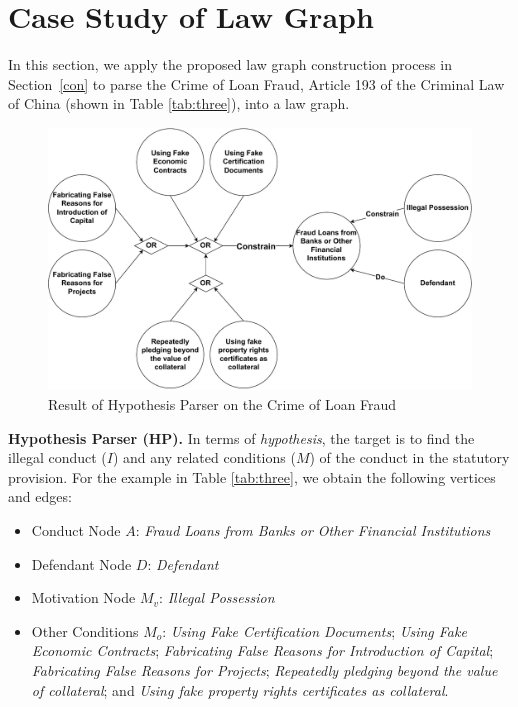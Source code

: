 \section{Case Study of Law Graph}
\label{sec:a}
In this section, we apply the proposed law graph construction process in Section~\ref{con} to parse the Crime of Loan Fraud, Article 193 of the Criminal Law of China (shown in Table \ref{tab:three}), into a law graph.

\begin{figure}[H]
    \centering
    \includegraphics[width=1\linewidth]{figs/HP-Result.pdf}
    \caption{Result of Hypothesis Parser on the Crime of Loan Fraud}
    \label{fig:HP-Result}
\end{figure}

\textbf{Hypothesis Parser (HP).} In terms of \textit{hypothesis}, the target is to find the illegal conduct (\( I \)) and any related conditions (\( M \)) of the conduct in the statutory provision. For the example in Table \ref{tab:three}, we obtain the following vertices and edges:
\begin{itemize}
    \item Conduct Node $A$: \textit{Fraud Loans from Banks or Other Financial Institutions}
    \item Defendant Node $D$: \textit{Defendant}
    \item Motivation Node $M_v$: \textit{Illegal Possession}
    \item Other Conditions $M_o$: \textit{Using Fake Certification Documents}; \textit{Using Fake Economic Contracts}; \textit{Fabricating False Reasons for Introduction of Capital}; \textit{Fabricating False Reasons for Projects}; \textit{Repeatedly pledging beyond the value of collateral}; and \textit{Using fake property rights certificates as collateral}.
\end{itemize}

